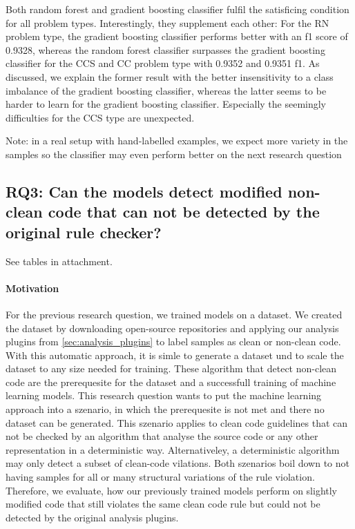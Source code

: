  Both random forest and gradient boosting classifier fulfil the satisficing condition for all problem types. Interestingly, they supplement each other: For the RN problem type, the gradient boosting classifier performs better with an f1 score of 0.9328, whereas the random forest classifier surpasses the gradient boosting classifier for the CCS and CC problem type with 0.9352 and 0.9351 f1. As discussed, we explain the former result with the better insensitivity to a class imbalance of the gradient boosting classifier, whereas the latter seems to be harder to learn for the gradient boosting classifier. Especially the seemingly difficulties for the CCS type are unexpected.
 
 Note: in a real setup with hand-labelled examples, we expect more variety in the samples so the classifier may even perform better on the next research question 


 \subsection{RQ3: Can the models detect modified non-clean code that can not be detected by the original rule checker? }
See tables in attachment.

\paragraph{Motivation}
For the previous research question, we trained models on a dataset. We created the dataset by downloading open-source repositories and applying our analysis plugins from \ref{sec:analysis_plugins} to label samples as clean or non-clean code. With this automatic approach, it is simle to generate a dataset und to scale the dataset to any size needed for training. These algorithm that detect non-clean code are the prerequesite for the dataset and a successfull training of machine learning models. This research question wants to put the machine learning approach into a szenario, in which the prerequesite is not met and there no dataset can be generated. This szenario applies to clean code guidelines that can not be checked by an algorithm that analyse the source code or any other representation in a deterministic way. Alternativeley, a deterministic algorithm may only detect a subset of clean-code vilations. Both szenarios boil down to not having samples for all or many structural variations of the rule violation. Therefore, we evaluate, how our previously trained models perform on slightly modified code that still violates the same clean code rule but could not be detected by the original analysis plugins.


